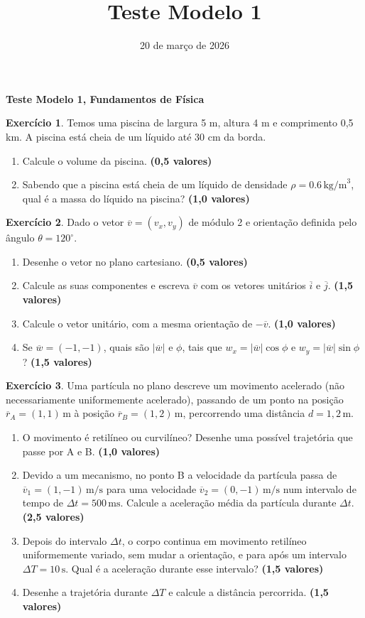 \documentclass[12pt]{article}
\title{Teste Modelo 1}
\author{}
\date{20 de março de 2026}
\newcommand{\cabecalho}{
	\hfill
	\begin{minipage}[t]{0.7\textwidth}
		\raggedleft
		\textbf{Teste Modelo 1, Fundamentos de Física}
	\end{minipage}
	
}
\newcommand{\pontos}[1]{\hfill\textbf{(#1 valores)}}
\begin{document}
	
	\cabecalho
	
	\textbf{Exercício 1}. Temos uma piscina de largura 5 m, altura 4 m e comprimento 0,5 km. A piscina está cheia de um líquido até 30 cm da borda.
	\begin{enumerate}[label=\alph*)]
		\item Calcule o volume da piscina. \pontos{0,5}
		\item Sabendo que a piscina está cheia de um líquido de densidade $\rho = 0.6\,\text{kg/m}^3$, qual é a massa do líquido na piscina? \pontos{1,0}
	\end{enumerate}
	
	\vspace{0.4cm}
	
	\textbf{Exercício 2}. Dado o vetor $\overline{v} = (v_x, v_y)$ de módulo 2 e orientação definida pelo ângulo $\theta = 120^\circ$.
	\begin{enumerate}[label=\alph*)]
		\item Desenhe o vetor no plano cartesiano. \pontos{0,5}
		\item Calcule as suas componentes e escreva $\overline{v}$ com os vetores unitários $\overline{i}$ e $\overline{j}$. \pontos{1,5}
		\item Calcule o vetor unitário, com a mesma orientação de $-\overline{v}$. \pontos{1,0}
		\item Se $\overline{w} = (-1,-1)$, quais são $|\overline{w}|$ e $\phi$, tais que $w_x = |\overline{w}| \cos \phi$ e $w_y = |\overline{w}| \sin \phi$? \pontos{1,5}
	\end{enumerate}
	
	\vspace{0.4cm}
	
	\textbf{Exercício 3}. Uma partícula no plano descreve um movimento acelerado (não necessariamente uniformemente acelerado), passando de um ponto na posição $\overline{r}_A = (1,1)\,\text{m}$ à posição $\overline{r}_B = (1,2)\,\text{m}$, percorrendo uma distância $d = 1,2\,\text{m}$.
	\begin{enumerate}[label=\alph*)]
		\item O movimento é retilíneo ou curvilíneo? Desenhe uma possível trajetória que passe por A e B. \pontos{1,0}
		\item Devido a um mecanismo, no ponto B a velocidade da partícula passa de $\overline{v}_1 = (1,-1)\,\text{m/s}$ para uma velocidade $\overline{v}_2 = (0,-1)\,\text{m/s}$ num intervalo de tempo de $\Delta t = 500\,\text{ms}$. Calcule a aceleração média da partícula durante $\Delta t$. \pontos{2,5}
		\item Depois do intervalo $\Delta t$, o corpo continua em movimento retilíneo uniformemente variado, sem mudar a orientação, e para após um intervalo $\Delta T = 10\,\text{s}$. Qual é a aceleração durante esse intervalo? \pontos{1,5}
		\item Desenhe a trajetória durante $\Delta T$ e calcule a distância percorrida. \pontos{1,5}
	\end{enumerate}
	
\end{document}
